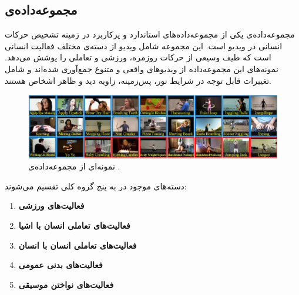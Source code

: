 \subsection{مجموعه‌داده‌ی }
مجموعه‌داده‌ی  \cite{ucf101} یکی از مجموعه‌داده‌های استاندارد و پرکاربرد در زمینه تشخیص حرکات انسانی در ویدیو است. 
این مجموعه شامل  ویدیو از  دسته‌ی مختلف فعالیت انسانی است که طیف وسیعی از حرکات روزمره، ورزشی و تعاملی را پوشش می‌دهد. 
نمونه‌های این مجموعه‌داده از ویدیوهای واقعی و متنوع جمع‌آوری شده‌اند و شامل تغییرات قابل توجه در شرایط نور، پس‌زمینه، زاویه دید و ظاهر اشخاص هستند.
\begin{figure}
	\centering\includegraphics[scale=.5]{Images/Chapter4/ucf101.png}
	\caption[نمونه‌ای از مجموعه‌داده‌ی ]{ نمونه‌ای از مجموعه‌داده‌ی \cite{ucf101}.}
	\label{fig.41}
\end{figure}
دسته‌های موجود در  به پنج گروه کلی تقسیم می‌شوند:
\begin{enumerate}
	\item \textbf{‌فعالیت‌های ورزشی} 
	\item \textbf{فعالیت‌های تعاملی انسان با اشیا} 
	\item \textbf{فعالیت‌های تعاملی انسان با انسان} 
	\item \textbf{فعالیت‌های بدنی عمومی} 
	\item \textbf{فعالیت‌های نواختن موسیقی} 
\end{enumerate}

